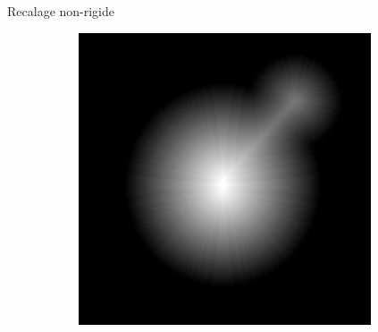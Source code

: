 \documentclass[10pt]{beamer}
\begin{document}
\begin{frame}{Recalage non-rigide}
\begin{figure}[ht]
\begin{subfigure}[t]{0.2\textwidth}
    \caption{}
    \label{subfig:registration_dt_target_interpol}
  \end{subfigure}%
  \begin{subfigure}[t]{0.2\textwidth}
    \centering
    \includegraphics[width=0.95\textwidth]{fig/registration_target_dt}
    \caption{}
    \label{subfig:registration_dt_target}
  \end{subfigure}%
\end{figure}
\end{frame}
\end{document}

